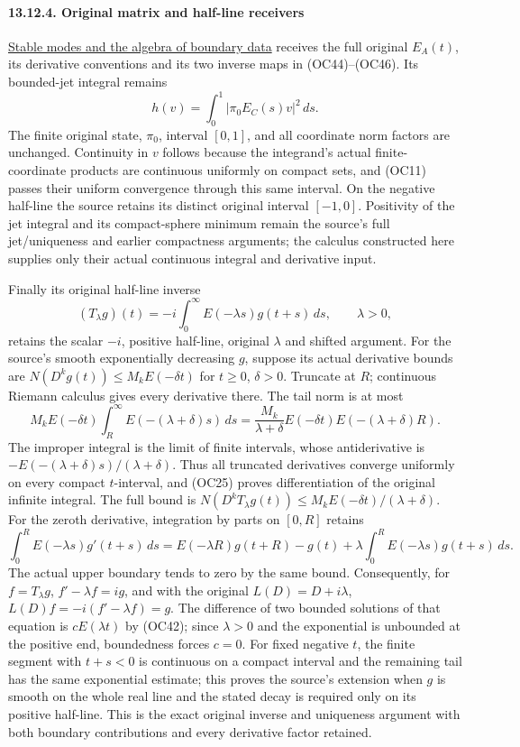 \documentclass[
  11pt,
]{article}
\begin{document}
\paragraph{13.12.4. Original matrix and half-line
receivers}\label{original-matrix-and-half-line-receivers}

\href{stable-boundary-models.pdf}{Stable modes and the algebra of
boundary data} receives the full original \(E_A(t)\), its derivative
conventions and its two inverse maps in (OC44)--(OC46). Its bounded-jet
integral remains \[
 h(v)=\int_0^1|\pi_0E_C(s)v|^2\,ds.
\tag{OC51}
\] The finite original state, \(\pi_0\), interval \([0,1]\), and all
coordinate norm factors are unchanged. Continuity in \(v\) follows
because the integrand's actual finite-coordinate products are continuous
uniformly on compact sets, and (OC11) passes their uniform convergence
through this same interval. On the negative half-line the source retains
its distinct original interval \([-1,0]\). Positivity of the jet
integral and its compact-sphere minimum remain the source's full
jet/uniqueness and earlier compactness arguments; the calculus
constructed here supplies only their actual continuous integral and
derivative input.

Finally its original half-line inverse \[
 (T_\lambda g)(t)=-i\int_0^\infty E(-\lambda s)g(t+s)\,ds,
 \qquad \lambda>0,
\tag{OC52}
\] retains the scalar \(-i\), positive half-line, original \(\lambda\)
and shifted argument. For the source's smooth exponentially decreasing
\(g\), suppose its actual derivative bounds are
\(N(D^k g(t))\le M_kE(-\delta t)\) for \(t\ge0\), \(\delta>0\). Truncate
at \(R\); continuous Riemann calculus gives every derivative there. The
tail norm is at most \[
 M_k E(-\delta t)\int_R^\infty E(-(\lambda+\delta)s)\,ds
 =\frac{M_k}{\lambda+\delta}E(-\delta t)E(-(\lambda+\delta)R).
\tag{OC53}
\] The improper integral is the limit of finite intervals, whose
antiderivative is \(-E(-(\lambda+\delta)s)/(\lambda+\delta)\). Thus all
truncated derivatives converge uniformly on every compact
\(t\)-interval, and (OC25) proves differentiation of the original
infinite integral. The full bound is
\(N(D^kT_\lambda g(t))\le M_kE(-\delta t)/(\lambda+\delta)\). For the
zeroth derivative, integration by parts on \([0,R]\) retains \[
 \int_0^R E(-\lambda s)g'(t+s)\,ds
 =E(-\lambda R)g(t+R)-g(t)
    +\lambda\int_0^R E(-\lambda s)g(t+s)\,ds.
\tag{OC54}
\] The actual upper boundary tends to zero by the same bound.
Consequently, for \(f=T_\lambda g\), \(f'-\lambda f=i g\), and with the
original \(L(D)=D+i\lambda\), \(L(D)f=-i(f'-\lambda f)=g\). The
difference of two bounded solutions of that equation is
\(cE(\lambda t)\) by (OC42); since \(\lambda>0\) and the exponential is
unbounded at the positive end, boundedness forces \(c=0\). For fixed
negative \(t\), the finite segment with \(t+s<0\) is continuous on a
compact interval and the remaining tail has the same exponential
estimate; this proves the source's extension when \(g\) is smooth on the
whole real line and the stated decay is required only on its positive
half-line. This is the exact original inverse and uniqueness argument
with both boundary contributions and every derivative factor retained.
\end{document}
